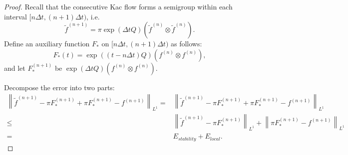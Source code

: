 \documentclass{article}
\numberwithin{equation}{section}
\begin{document}
\begin{proof}
    Recall that the consecutive Kac flow forms a semigroup within each interval $[n\Delta t,(n+1)\Delta t)$, i.e.
    \begin{equation*}
        \widetilde{f}^{(n+1)} = \pi \exp{(\Delta t Q)} \left(\widetilde{f}^{(n)}\otimes \widetilde{f}^{(n)}\right).
    \end{equation*}
    Define an auxiliary function $F_{*}$ on $[n\Delta t, (n+1)\Delta t)$ as follows:
    \begin{equation*}
        F_{*}(t)= \exp{((t-n\Delta t) Q)} \left(f^{(n)}\otimes f^{(n)}\right),
    \end{equation*}
    and let $F_{*}^{(n+1)}$ be $\exp{(\Delta t Q)} \left(f^{(n)}\otimes f^{(n)}\right)$.

    Decompose the error into two parts:
    \begin{equation*}
        \begin{split}
            \left\lVert \widetilde{f}^{(n+1)}- \pi F_{*}^{(n+1)} +  \pi F_{*}^{(n+1)} - f^{(n+1)}\right\rVert_{L^{1}} = &\left\lVert \widetilde{f}^{(n+1)}- \pi F_{*}^{(n+1)} +  \pi F_{*}^{(n+1)} - f^{(n+1)}\right\rVert_{L^{1}}\\
            \leq &\left\lVert \widetilde{f}^{(n+1)}- \pi F_{*}^{(n+1)}\right\rVert_{L^{1}} + \left\lVert \pi F_{*}^{(n+1)} - f^{(n+1)}\right\rVert_{L^{1}}\\
            =& E_{stability} + E_{local}.
        \end{split}
    \end{equation*}


\end{proof}
\end{document}
